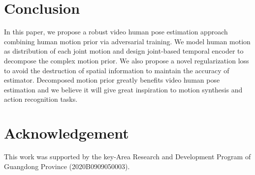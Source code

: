 \documentclass{svproc}
\begin{document}
\section{Conclusion}

In this paper, we propose a robust video human pose estimation approach combining human motion prior via adversarial training. We model human motion as distribution of each joint motion and design joint-based temporal encoder to decompose the complex motion prior. We also propose a novel regularization loss to avoid the destruction of spatial information to maintain the accuracy of estimator. Decomposed motion prior greatly benefits video human pose estimation and we believe it will give great inspiration to motion synthesis and action recognition tasks.


\section{Acknowledgement}
This work was supported by the key-Area Research and Development Program of Guangdong Province (2020B0909050003).

\newpage
\end{document}
